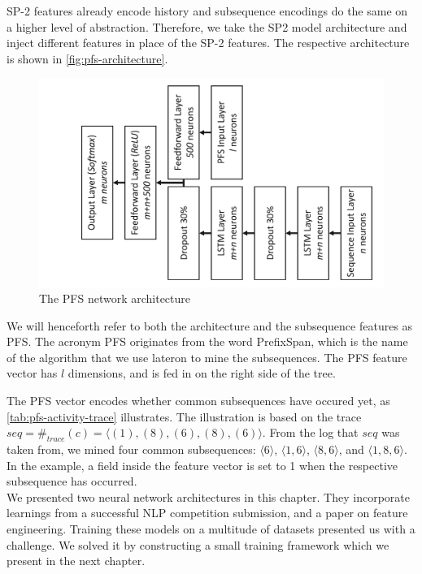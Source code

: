 SP-2 features already encode history and subsequence encodings do the same on a higher level of abstraction.
Therefore, we take the SP2 model architecture and inject different features in place of the SP-2 features.
The respective architecture is shown in \autoref{fig:pfs-architecture}.

\begin{figure}
    \centering
    \includegraphics[width=.8\textwidth,angle=-90,origin=c]{gfx/pfs-network-architecture.pdf}
    \caption{The PFS network architecture}
    \label{fig:pfs-architecture}
\end{figure}

We will henceforth refer to both the architecture and the subsequence features as PFS.
The acronym PFS originates from the word PrefixSpan, which is the name of the algorithm that we use lateron to mine the subsequences.
The PFS feature vector has $l$ dimensions, and is fed in on the right side of the tree.

The PFS vector encodes whether common subsequences have occured yet, as \autoref{tab:pfs-activity-trace} illustrates.
The illustration is based on the trace $seq=\#_{trace}(c)=\langle (1), (8), (6), (8), (6)\rangle$.
From the log that $seq$ was taken from, we mined four common subsequences: $\langle 6\rangle$, $\langle 1,6\rangle$, $\langle 8,6\rangle$, and $\langle1,8,6\rangle$.
In the example, a field inside the feature vector is set to 1 when the respective subsequence has occurred.\\

We presented two neural network architectures in this chapter. They incorporate
learnings from a successful NLP competition submission, and a paper on feature engineering.
Training these models on a multitude of datasets presented us with a challenge.
We solved it by constructing a small training framework which we present in the next chapter.


